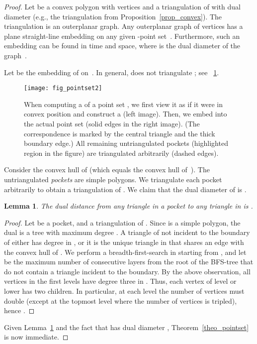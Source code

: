 \documentclass{article}
\newtheorem{lemma}[theorem]{Lemma}
\begin{document}
\begin{proof}
Let  be a convex polygon with  vertices and
 a triangulation of  with dual diameter
 (e.g., the triangulation from
Proposition~\ref{prop_convex}).
The triangulation  is an outerplanar graph.
Any outerplanar graph of  vertices has a plane
straight-line embedding on any given -point set~\cite{pgmp-eptvsp-91}.
Furthermore, such an embedding can be found in 
time and  space, where  is the dual diameter of the
graph~\cite{b-oeopgps-02}.

Let  be the embedding of  on~.
In general,  does not triangulate ; see \figurename~\ref{fig_pointset}.
\begin{figure}[tb]
\centering
\texttt{[image: fig\_pointset2]}
\caption{When computing a  of a point set , we first view it as if it were in convex position and construct a  (left image).
Then, we embed  into the actual point set (solid edges in the right image).
(The correspondence is marked by the central triangle and the thick boundary edge.)
All remaining untriangulated pockets (highlighted region in the figure) are triangulated arbitrarily (dashed edges). }
\label{fig_pointset}
\end{figure}
Consider the convex hull of  (which equals the convex hull of~).
The untriangulated \emph{pockets} are simple polygons.
We triangulate each pocket arbitrarily to obtain
a triangulation  of .
We claim that the dual diameter of  is .
\begin{lemma}\label{lem_logpoly}
The dual distance from any
triangle in a pocket to any triangle in  
is .
\end{lemma}
\begin{proof}
Let  be a pocket, and 
a triangulation of .
Since  is a simple polygon, the dual  is a 
tree with maximum degree .
A triangle  of  
not incident to the boundary of  either has
degree  in , or it is the unique triangle in  
that shares an edge with the convex hull of .
We perform a breadth-first-search in  starting from ,
and let  be the maximum number of consecutive layers from the root
of the BFS-tree that
do not contain a triangle incident to the boundary. 
By the above observation, all vertices in the first  levels have degree three in . Thus, each vertex of level  or lower has two children. In particular, at each level the number of vertices must double (except at the topmost level where the number of vertices is tripled), hence . 
\end{proof}

Given Lemma~\ref{lem_logpoly} and the fact that
 has dual diameter , 
Theorem~\ref{theo_pointset} is now immediate.
\end{proof}
\end{document}
